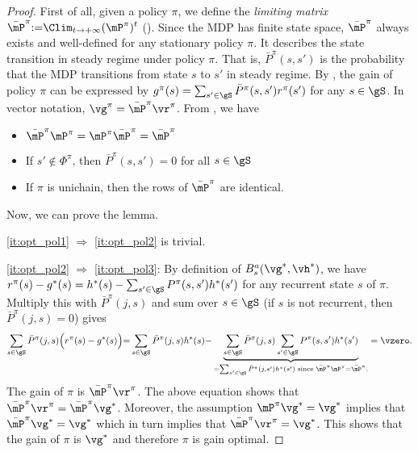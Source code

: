\begin{proof}
    First of all, given a policy $\pi$, we define the \emph{limiting matrix} $\bar{\mP}^\pi{:=}\displaystyle\Clim_{t\to+\infty}{(\mP^\pi)^t}$ (\cite[Appendix~A.4]{puterman2014markov}). %
    Since the MDP has finite state space, $\bar{\mP}^\pi$ always exists and well-defined for any stationary policy $\pi$.
    It describes the state transition in steady regime under policy $\pi$.
    That is, $\bar{P}^\pi(s,s')$ is the probability that the MDP transitions from state $s$ to $s'$ in steady regime.
    By \cite[Theorem~8.2.6]{puterman2014markov}, the gain of policy $\pi$ can be expressed by $g^\pi(s)=\sum_{s'\in\gS}\bar{P}^\pi(s,s')r^\pi(s')$ for any $s\in\gS$.
    In vector notation, $\vg^\pi=\bar{\mP}^\pi\vr^\pi$.
    From \cite[Section~A.4]{puterman2014markov}, we have
    \begin{itemize}
        \item $\bar{\mP}^\pi\mP^\pi =\mP^\pi\bar{\mP}^\pi =\bar{\mP}^\pi$
        \item If $s'\notin\Phi^\pi$, then $\bar{P}^\pi(s,s')=0$ for all $s\in\gS$
        \item If $\pi$ is unichain, then the rows of $\bar{\mP}^\pi$ are identical.
    \end{itemize}
    Now, we can prove the lemma.

    \ref{it:opt_pol1} $\Rightarrow$ \ref{it:opt_pol2} is trivial.

    \ref{it:opt_pol2} $\Rightarrow$ \ref{it:opt_pol3}: By definition of $B_s^a(\vg^*,\vh^*)$, we have $r^{\pi}(s)-g^*(s) = h^*(s)-\sum_{s'\in\gS} P^{\pi}(s,s')h^*(s')$ for any recurrent state $s$ of $\pi$.  Multiply this with $\bar{P}^\pi(j,s)$ and sum over $s\in\gS$ (if $s$ is not recurrent, then $\bar{P}^\pi(j,s)=0$) gives
    \begin{align*}
        \sum_{s\in\gS} \bar{P}^\pi(j,s)\Big(r^{\pi}(s)-g^*(s)\Big) {=} \sum_{s\in\gS} \bar{P}^\pi(j,s)h^*(s) {-} \underbrace{\sum_{s\in\gS} \bar{P}^\pi(j,s)\sum_{s'\in\gS} P^{\pi}(s,s')h^*(s')}_{=\sum_{s'\in\gS} \bar{P}^\pi(j,s')h^*(s') \text{ since $\bar{\mP}^\pi\mP^\pi{=}\bar{\mP}^\pi$.}}
        = \vzero.
    \end{align*}
    The gain of $\pi$ is $\bar{\mP}^\pi \vr^\pi$.
    The above equation shows that $\bar{\mP}^\pi\vr^\pi = \bar{\mP}^\pi\vg^*$. Moreover, the assumption  $\mP^\pi\vg^*=\vg^*$ implies that $\bar{\mP}^\pi\vg^*=\vg^*$ which in turn implies that $\bar{\mP}^\pi\vr^\pi=\vg^*$. This shows that the gain of $\pi$ is $\vg^*$ and therefore $\pi$ is gain optimal.


\end{proof}
